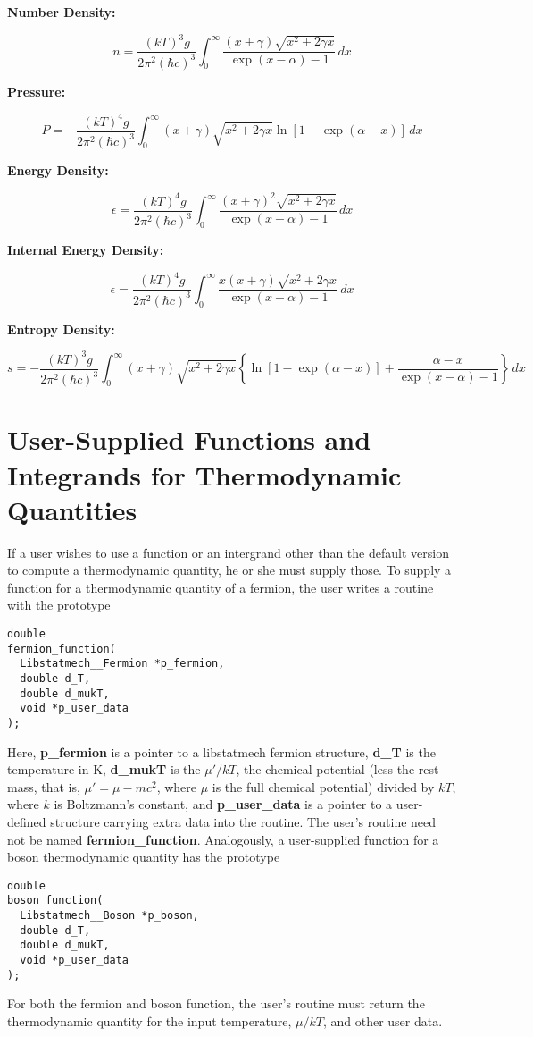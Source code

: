 \documentclass{article}    %
\begin{document}
\begin{center}
{\bf Number Density:}
\end{center}
\[
n = \frac {(kT)^3g} {2\pi^2(\hbar c)^3}
  \int_0^{\infty} \frac {(x+\gamma)\sqrt{x^2+2\gamma x}} {{\exp}(x-\alpha)-1}
  \, dx
\]
\begin{center}
{\bf Pressure:}
\end{center}
\[
P = -\frac {(kT)^4g} {2\pi^2(\hbar c)^3} \int_0^{\infty}
  (x+\gamma)\sqrt{x^2+2\gamma x} {\ln}[1-{\exp}(\alpha-x)]
  \, dx
\]
\begin{center}
{\bf Energy Density:}
\end{center}
\[
\epsilon = \frac {(kT)^4g} {2\pi^2(\hbar c)^3} \int_0^{\infty}
  \frac {(x+\gamma)^2\sqrt{x^2+2\gamma x}} {{\exp}(x-\alpha)-1}
  \, dx
\]
\begin{center}
{\bf Internal Energy Density:}
\end{center}
\[
\epsilon = \frac {(kT)^4g} {2\pi^2(\hbar c)^3} \int_0^{\infty}
  \frac {x (x+\gamma)\sqrt{x^2+2\gamma x}} {{\exp}(x-\alpha)-1}
  \, dx
\]
\begin{center}
{\bf Entropy Density:}
\end{center}
\[
s = -\frac {(kT)^3g} {2\pi^2(\hbar c)^3} \int_0^{\infty}
  {(x+\gamma)\sqrt{x^2+2\gamma x}}
  \left\{ {\ln}[1-{\exp}(\alpha-x)] + \frac{\alpha-x}{ {\exp}(x-\alpha)-1}
  \right\}
  \, dx
\]

\section{User-Supplied Functions and Integrands for Thermodynamic Quantities}

If a user wishes to use a function or an intergrand other than the default
version to compute a thermodynamic quantity, he or she must supply those.
To supply a function for a thermodynamic quantity of a fermion, the user
writes a routine with the prototype
\begin{verbatim}
double
fermion_function(
  Libstatmech__Fermion *p_fermion, 
  double d_T,
  double d_mukT,
  void *p_user_data
);
\end{verbatim}
Here, {\bf p\_fermion} is a pointer to a libstatmech fermion structure,
{\bf d\_T} is the temperature in K, {\bf d\_mukT} is the $\mu' / kT$,
the chemical potential (less the rest mass, that is, $\mu' = \mu - mc^2$,
where $\mu$ is the full chemical potential) divided by $kT$,
where $k$ is Boltzmann's constant,
and {\bf p\_user\_data} is a pointer to a user-defined structure carrying
extra data into the routine.  The user's routine need not be named
{\bf fermion\_function}.  Analogously, a user-supplied function for a boson
thermodynamic quantity has the prototype
\begin{verbatim}
double
boson_function(
  Libstatmech__Boson *p_boson, 
  double d_T,
  double d_mukT,
  void *p_user_data
);
\end{verbatim}
For both the fermion and boson function, the user's routine must return the
thermodynamic quantity for the input temperature, $\mu/kT$, and other user
data.
\end{document}
